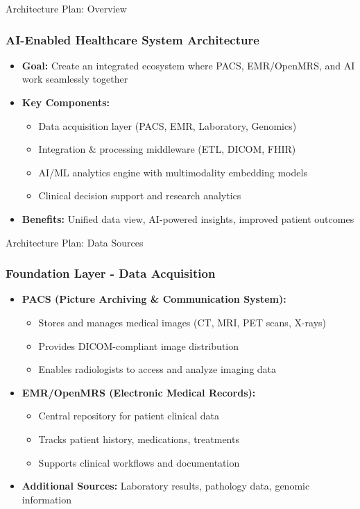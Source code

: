 \documentclass{beamer}
\begin{document}
\begin{frame}{Architecture Plan: Overview}
    \frametitle{AI-Enabled Healthcare System Architecture}
    \begin{itemize}
        \item \textbf{Goal:} Create an integrated ecosystem where PACS, EMR/OpenMRS, and AI work seamlessly together
        \item \textbf{Key Components:}
        \begin{itemize}
            \item Data acquisition layer (PACS, EMR, Laboratory, Genomics)
            \item Integration \& processing middleware (ETL, DICOM, FHIR)
            \item AI/ML analytics engine with multimodality embedding models
            \item Clinical decision support and research analytics
        \end{itemize}
        \item \textbf{Benefits:} Unified data view, AI-powered insights, improved patient outcomes
    \end{itemize}
\end{frame}

\begin{frame}{Architecture Plan: Data Sources}
    \frametitle{Foundation Layer - Data Acquisition}
    \begin{itemize}
        \item \textbf{PACS (Picture Archiving \& Communication System):}
        \begin{itemize}
            \item Stores and manages medical images (CT, MRI, PET scans, X-rays)
            \item Provides DICOM-compliant image distribution
            \item Enables radiologists to access and analyze imaging data
        \end{itemize}
        \item \textbf{EMR/OpenMRS (Electronic Medical Records):}
        \begin{itemize}
            \item Central repository for patient clinical data
            \item Tracks patient history, medications, treatments
            \item Supports clinical workflows and documentation
        \end{itemize}
        \item \textbf{Additional Sources:} Laboratory results, pathology data, genomic information
    \end{itemize}
\end{frame}
\end{document}
